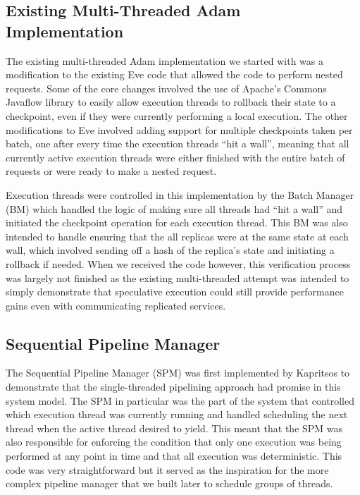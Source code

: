 \documentclass[11pt, oneside]{report}
\begin{document}
\subsection{Existing Multi-Threaded Adam Implementation}\label{BM}

The existing multi-threaded Adam implementation we started with was a modification to the existing Eve \cite{eve} code that allowed the code to perform nested requests. 
Some of the core changes involved the use of Apache's Commons Javaflow library \cite{javaflow} to easily allow execution threads to rollback their state to a checkpoint, even if they were currently performing a local execution. 
The other modifications to Eve involved adding support for multiple checkpoints taken per batch, one after every time the execution threads ``hit a wall'', meaning that all currently active execution threads were either finished with the entire batch of requests or were ready to make a nested request.

Execution threads were controlled in this implementation by the Batch Manager (BM) which handled the logic of making sure all threads had ``hit a wall'' and initiated the checkpoint operation for each execution thread. 
This BM was also intended to handle ensuring that the all replicas were at the same state at each wall, which involved sending off a hash of the replica's state and initiating a rollback if needed. 
When we received the code however, this verification process was largely not finished as the existing multi-threaded attempt was intended to simply demonstrate that speculative execution could still provide performance gains even with communicating replicated services.

\subsection{Sequential Pipeline Manager}\label{SPM}

The Sequential Pipeline Manager (SPM) was first implemented by Kapritsos to demonstrate that the single-threaded pipelining approach had promise in this system model. 
The SPM in particular was the part of the system that controlled which execution thread was currently running and handled scheduling the next thread when the active thread desired to yield.
This meant that the SPM was also responsible for enforcing the condition that only one execution was being performed at any point in time and that all execution was deterministic.
This code was very straightforward but it served as the inspiration for the more complex pipeline manager that we built later to schedule groups of threads.
\end{document}
